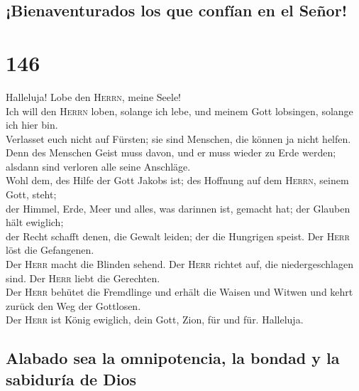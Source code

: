 \hypertarget{bienaventurados-los-que-confuxedan-en-el-seuxf1or}{%
\subsection{¡Bienaventurados los que confían en el
Señor!}\label{bienaventurados-los-que-confuxedan-en-el-seuxf1or}}

\hypertarget{section-145}{%
\section{146}\label{section-145}}

 Halleluja! Lobe den \textsc{Herrn}, meine Seele!\\
 Ich will den \textsc{Herrn} loben, solange ich lebe, und
meinem Gott lobsingen, solange ich hier bin.\\
 Verlasset euch nicht auf Fürsten; sie sind Menschen, die
können ja nicht helfen.\\
 Denn des Menschen Geist muss davon, und er muss wieder zu
Erde werden; alsdann sind verloren alle seine Anschläge.\\
 Wohl dem, des Hilfe der Gott Jakobs ist; des Hoffnung auf
dem \textsc{Herrn}, seinem Gott, steht;\\
 der Himmel, Erde, Meer und alles, was darinnen ist,
gemacht hat; der Glauben hält ewiglich;\\
 der Recht schafft denen, die Gewalt leiden; der die
Hungrigen speist. Der \textsc{Herr} löst die Gefangenen.\\
 Der \textsc{Herr} macht die Blinden sehend. Der
\textsc{Herr} richtet auf, die niedergeschlagen sind. Der \textsc{Herr}
liebt die Gerechten.\\
 Der \textsc{Herr} behütet die Fremdlinge und erhält die
Waisen und Witwen und kehrt zurück den Weg der Gottlosen.\\
 Der \textsc{Herr} ist König ewiglich, dein Gott, Zion,
für und für. Halleluja.

\hypertarget{alabado-sea-la-omnipotencia-la-bondad-y-la-sabiduruxeda-de-dios}{%
\subsection{Alabado sea la omnipotencia, la bondad y la sabiduría de
Dios}\label{alabado-sea-la-omnipotencia-la-bondad-y-la-sabiduruxeda-de-dios}}


